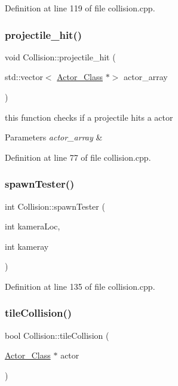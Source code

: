 Definition at line 119 of file collision.\+cpp.

\hypertarget{class_collision_a6705beb3ad1e1d3e2e882ca21af5a46f}{}\label{class_collision_a6705beb3ad1e1d3e2e882ca21af5a46f} 
\subsubsection{\texorpdfstring{projectile\+\_\+hit()}{projectile\_hit()}}
{\footnotesize\ttfamily void Collision\+::projectile\+\_\+hit (\begin{DoxyParamCaption}\item[{std\+::vector$<$ \hyperlink{class_actor___class}{Actor\+\_\+\+Class} $\ast$$>$}]{actor\+\_\+array }\end{DoxyParamCaption})}

this function checks if a projectile hits a actor 
\begin{DoxyParams}{Parameters}
{\em actor\+\_\+array} & \\
\hline
\end{DoxyParams}


Definition at line 77 of file collision.\+cpp.

\hypertarget{class_collision_ae9a5eceff1beb6584cafe16d10d59396}{}\label{class_collision_ae9a5eceff1beb6584cafe16d10d59396} 
\subsubsection{\texorpdfstring{spawn\+Tester()}{spawnTester()}}
{\footnotesize\ttfamily int Collision\+::spawn\+Tester (\begin{DoxyParamCaption}\item[{int}]{kamera\+Loc,  }\item[{int}]{kameray }\end{DoxyParamCaption})}



Definition at line 135 of file collision.\+cpp.

\hypertarget{class_collision_a31573f99490d4a5940ed2a1fc796289d}{}\label{class_collision_a31573f99490d4a5940ed2a1fc796289d} 
\subsubsection{\texorpdfstring{tile\+Collision()}{tileCollision()}}
{\footnotesize\ttfamily bool Collision\+::tile\+Collision (\begin{DoxyParamCaption}\item[{\hyperlink{class_actor___class}{Actor\+\_\+\+Class} $\ast$}]{actor }\end{DoxyParamCaption})}


